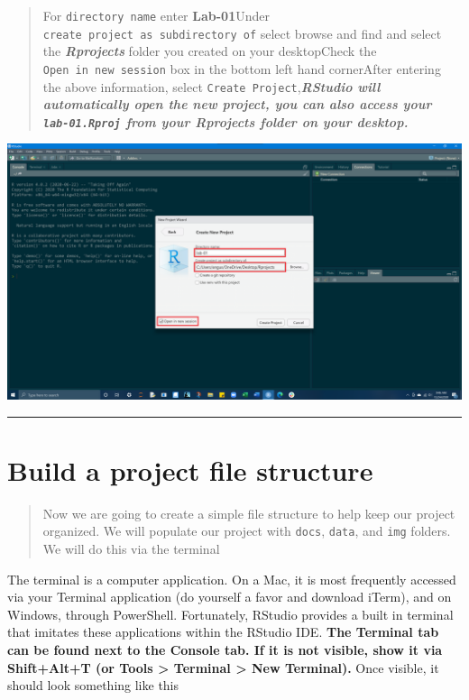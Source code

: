 \documentclass[
]{article}
\begin{document}
\begin{quote}
For \texttt{directory\ name} enter \textbf{Lab-01}Under
\texttt{create\ project\ as\ subdirectory\ of} select browse and find
and select the \textbf{\emph{Rprojects}} folder you created on your
desktopCheck the \texttt{Open\ in\ new\ session} box in the bottom left
hand cornerAfter entering the above information, select
\texttt{Create\ Project},\textbf{\emph{RStudio will automatically open
the new project, you can also access your \texttt{lab-01.Rproj} from
your Rprojects folder on your desktop.}}
\end{quote}

\includegraphics{img/create-new-proj.png}

\begin{center}\rule{0.5\linewidth}{0.5pt}\end{center}

\hypertarget{build-a-project-file-structure}{%
\section{\texorpdfstring{\textbf{Build a project file
structure}}{Build a project file structure}}\label{build-a-project-file-structure}}

\begin{quote}
Now we are going to create a simple file structure to help keep our
project organized. We will populate our project with \texttt{docs},
\texttt{data}, and \texttt{img} folders. We will do this via the
terminal
\end{quote}

The terminal is a computer application. On a Mac, it is most frequently
accessed via your Terminal application (do yourself a favor and download
iTerm), and on Windows, through PowerShell. Fortunately, RStudio
provides a built in terminal that imitates these applications within the
RStudio IDE. \textbf{The Terminal tab can be found next to the Console
tab. If it is not visible, show it via Shift+Alt+T (or Tools
\textgreater{} Terminal \textgreater{} New Terminal).} Once visible, it
should look something like this
\end{document}
